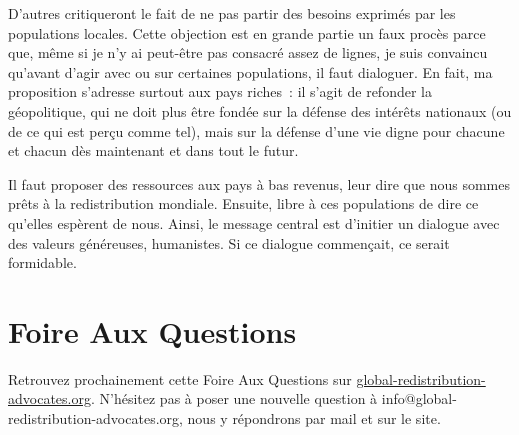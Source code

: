 \documentclass[a5paper,french,openany]{memoir}
\begin{document}
D'autres critiqueront le fait 
de ne pas partir des besoins exprimés par les populations locales. 
Cette objection est en grande partie un faux procès parce que, même si je n'y ai peut-être pas consacré assez de lignes, je suis convaincu qu'avant d'agir avec ou sur certaines populations, il faut dialoguer. En fait, ma proposition s'adresse surtout aux pays riches~: il s'agit de refonder la géopolitique, qui ne doit plus être fondée sur la défense des intérêts nationaux (ou de ce qui est perçu comme tel), mais sur la défense d'une vie digne pour chacune et chacun dès maintenant et dans tout le futur. 

Il faut proposer des ressources aux pays à bas revenus, leur dire que nous sommes prêts à la redistribution mondiale. Ensuite, libre à ces populations de dire ce qu'elles espèrent de nous. 
Ainsi, le message central est d'initier un dialogue avec des valeurs généreuses, humanistes. Si ce dialogue commençait, ce serait formidable. 

\chapter*{Foire Aux Questions}\label{ch:faq}

Retrouvez prochainement cette Foire Aux Questions sur \href{http://global-redistribution-advocates.org/}{global-redistribution-advocates.org}. N'hésitez pas à poser une nouvelle question à info@global-redistribution-advocates.org, nous y répondrons par mail et sur le site.
\end{document}
